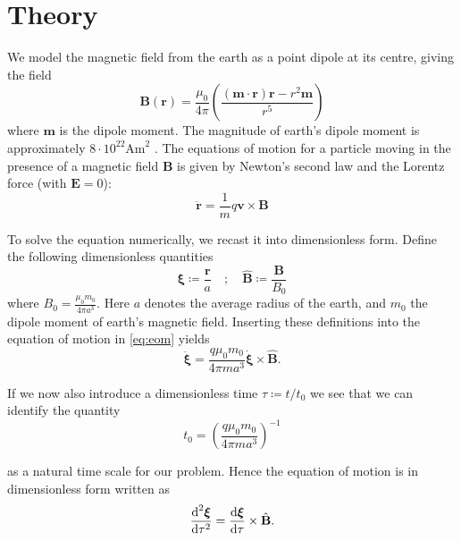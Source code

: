 \section{Theory}

We model the magnetic field from the earth as a point dipole at its centre, giving the field
\begin{equation}\label{eq:dipole}
	\mathbf{B}(\mathbf{r}) = \frac{\mu_0}{4 \pi} \left( \frac{(\mathbf{m} \cdot \mathbf{r}) \mathbf{r} - r^2 \mathbf{m}}{r^5} \right)
\end{equation}
where $\mathbf{m}$ is the dipole moment. The magnitude of earth's dipole moment is approximately $8\cdot10^{22} \mathrm{Am}^2$ \cite{Olson2006}. The equations of motion for a particle moving in the presence of a magnetic field $\mathbf{B}$ is given by Newton's second law and the Lorentz force (with $\mathbf{E} = 0$):
\begin{equation}\label{eq:eom}
	\ddot{\mathbf{r}} = \frac{1}{m} q \mathbf{v} \times \mathbf{B} 
\end{equation}

To solve the equation numerically, we recast it into dimensionless form. Define the following dimensionless quantities 
\begin{equation}
	\boldsymbol{\xi} \coloneqq \frac{\mathbf{r}}{a} \quad ; \quad \hat{\mathbf{B}} \coloneqq \frac{\mathbf{B}}{B_0}
\end{equation}
where $B_0 = \frac{\mu_0 m_0}{4 \pi a^3}$. Here $a$ denotes the average radius of the earth, and $m_0$ the dipole moment of earth's magnetic field. Inserting these definitions into the equation of motion in \ref{eq:eom} yields
\begin{equation}
	\ddot{\boldsymbol{\xi}} = \frac{q \mu_0 m_0}{4\pi m a^3} \dot{\boldsymbol{\xi}} \times \hat{\mathbf{B}}.
\end{equation}

If we now also introduce a dimensionless time $\tau \coloneqq t/t_0$ we see that we can identify the quantity 
\begin{equation}
	t_0 = \left(\frac{q \mu_0 m_0 }{4 \pi m a^3} \right)^{-1}
\end{equation}

as a natural time scale for our problem. Hence the equation of motion is in dimensionless form written as 
\begin{equation}\label{eq:simpleeom}
	\frac{\text{d}^2 \boldsymbol{\xi}}{\text{d}\tau^2} = \frac{\text{d} \boldsymbol{\xi}}{\text{d} \tau} \times \hat{\mathbf{B}}.
\end{equation}

